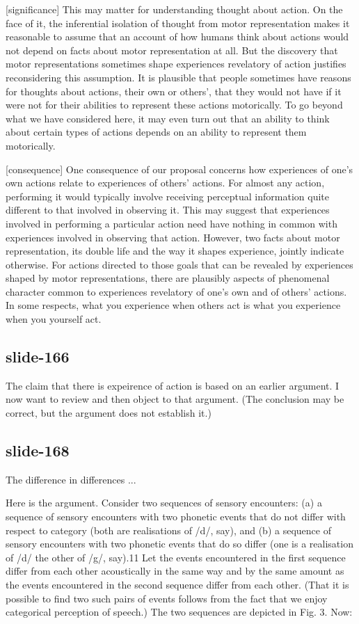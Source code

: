 \documentclass[12pt,\papersize]{extarticle}
\begin{document}
[significance]
This may matter for understanding thought about action. On the face of it, the inferential
isolation of thought from motor representation makes it reasonable to assume that an account of
how humans think about actions would not depend on facts about motor representation at all. But
the discovery that motor representations sometimes shape experiences revelatory of action
justifies reconsidering this assumption. It is plausible that people sometimes have reasons for
thoughts about actions, their own or others', that they would not have if it were not for their
abilities to represent these actions motorically. To go beyond what we have considered here, it
may even turn out that an ability to think about certain types of actions depends on an ability
to represent them motorically.

[consequence]
One consequence of our proposal concerns how experiences of one's own actions relate to
experiences of others' actions. For almost any action, performing it would typically involve
receiving perceptual information quite different to that involved in observing it. This may
suggest that experiences involved in performing a particular action need have nothing in common
with experiences involved in observing that action. However, two facts about motor
representation, its double life and the way it shapes experience, jointly indicate otherwise. For
actions directed to those goals that can be revealed by experiences shaped by motor
representations, there are plausibly aspects of phenomenal character common to experiences
revelatory of one's own and of others' actions. In some respects, what you experience when others
act is what you experience when you yourself act.

\subsection{slide-166}
The claim that there is expeirence of action is based on an earlier argument.
I now want to review and then object to that argument.
(The conclusion may be correct, but the argument does not establish it.)

\subsection{slide-168}
The difference in differences ...

Here is the argument. Consider two sequences of sensory encounters: (a) a sequence of sensory
encounters with two phonetic events that do not differ with respect to category (both are
realisations of /d/, say), and (b) a sequence of sensory encounters with two phonetic events that do
so differ (one is a realisation of /d/ the other of /g/, say).11 Let the events encountered in the
first sequence differ from each other acoustically in the same way and by the same amount as the
events encountered in the second sequence differ from each other. (That it is possible to find two
such pairs of events follows from the fact that we enjoy categorical perception of speech.) The two
sequences are depicted in Fig. 3. Now:
\end{document}
